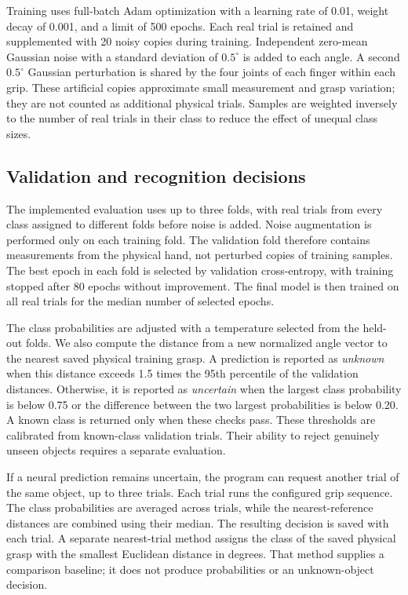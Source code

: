\documentclass[authoryear,12pt]{elsarticle}
\begin{document}
Training uses full-batch Adam optimization with a learning
rate of 0.01, weight decay of 0.001, and a limit of 500
epochs. Each real trial is retained and supplemented
with 20 noisy copies during training. Independent
zero-mean Gaussian noise with a standard deviation of
\(0.5^\circ\) is added to each angle. A second
\(0.5^\circ\) Gaussian perturbation is shared by the
four joints of each finger within each grip. These artificial copies
approximate small measurement and grasp variation; they
are not counted as additional physical trials. Samples
are weighted inversely to the number of real trials in
their class to reduce the effect of unequal class sizes.

\subsection{Validation and recognition decisions}
\label{sec:validation}

The implemented evaluation uses up to three folds, with
real trials from every class assigned to different folds
before noise is added. Noise augmentation is performed
only on each training fold. The validation fold therefore
contains measurements from the physical hand, not
perturbed copies of training samples. The best epoch in
each fold is selected by validation cross-entropy, with
training stopped after 80 epochs without improvement.
The final model is then trained on all real trials for
the median number of selected epochs.

The class probabilities are adjusted with a temperature
selected from the held-out folds. We also compute the
distance from a new normalized angle vector to the
nearest saved physical training grasp. A prediction is
reported as \emph{unknown} when this distance exceeds
1.5 times the 95th percentile of the validation
distances. Otherwise, it is reported as \emph{uncertain}
when the largest class probability is below 0.75 or
the difference between the two largest probabilities
is below 0.20. A known class is returned only when
these checks pass. These thresholds are calibrated from
known-class validation trials. Their ability to reject
genuinely unseen objects requires a separate evaluation.

If a neural prediction remains uncertain, the program
can request another trial of the same object, up to
three trials. Each trial runs the configured grip sequence.
The class probabilities are averaged across trials, while
the nearest-reference distances are combined using their
median. The resulting decision is saved with each trial.
A separate nearest-trial method assigns the class of the saved
physical grasp with the smallest Euclidean distance
in degrees. That method supplies a comparison baseline;
it does not produce probabilities or an unknown-object
decision.
\end{document}
